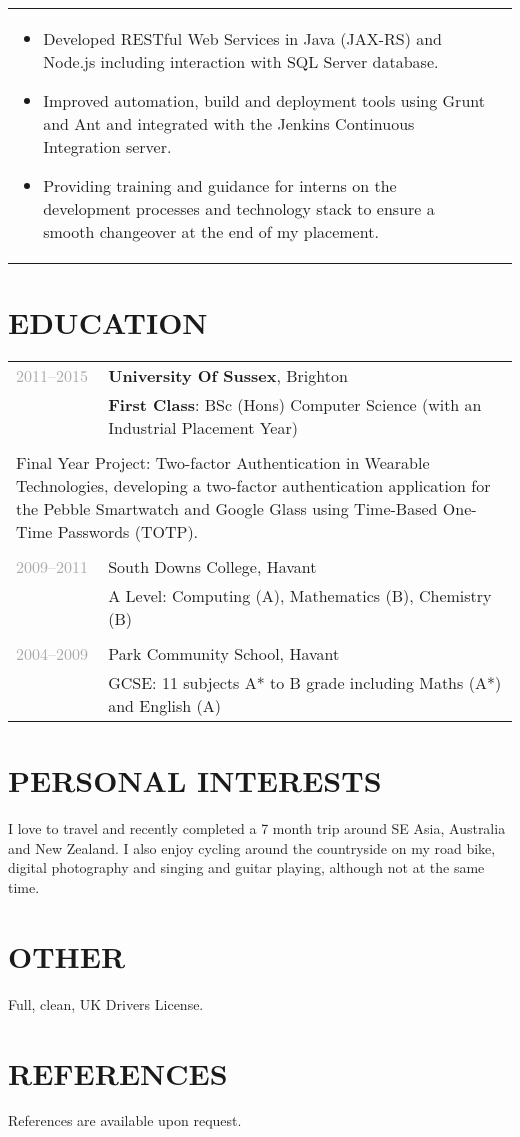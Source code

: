 \documentclass{article}
\newenvironment{exptable}{
  \begin{longtable}{lp{0.8\textwidth}}
  }{
  \end{longtable}
}
\begin{document}
\begin{exptable}
{\begin{itemize}
          \item Developed RESTful Web Services in Java (JAX-RS) and Node.js including interaction with SQL Server database.
          \item Improved automation, build and deployment tools using Grunt and Ant and integrated with the Jenkins Continuous Integration server.
          \item Providing training and guidance for interns on the development processes and technology stack to ensure a smooth changeover at the end of my placement.
        \end{itemize}
      } \\
    \end{exptable}

  \section*{EDUCATION}
    \begin{exptable}
      \textcolor{darkgray}{2011--2015} & {\bf University Of Sussex}, Brighton \\
                 & {\bf First Class}: BSc (Hons) Computer Science (with an Industrial Placement Year) \\
                 & \\
      \multicolumn{2}{p{\textwidth}}{
      Final Year Project: Two-factor Authentication in Wearable Technologies, developing a two-factor authentication application for the Pebble Smartwatch and Google Glass using Time-Based One-Time Passwords (TOTP).
      } \\
                 & \\
      \textcolor{darkgray}{2009--2011} & South Downs College, Havant \\
                 & A Level: Computing (A), Mathematics (B), Chemistry (B) \\
                 & \\
      \textcolor{darkgray}{2004--2009} & Park Community School, Havant \\
                 & GCSE: 11 subjects A* to B grade including Maths (A*) and English (A)
    \end{exptable}

 \section*{PERSONAL INTERESTS}
  I love to travel and recently completed a 7 month trip around SE Asia, Australia and New Zealand. 
  I also enjoy cycling around the countryside on my road bike, digital photography and singing and guitar playing, although not at the same time.

 \section*{OTHER}
   Full, clean, UK Drivers License.

  \section*{REFERENCES}
    References are available upon request.
\end{document}
